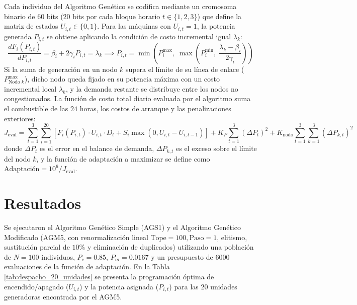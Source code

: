 \documentclass[11pt,letterpaper]{article}
\begin{document}
Cada individuo del Algoritmo Genético se codifica mediante un cromosoma binario de $60$ bits ($20$ bits por cada bloque horario $t \in \{1, 2, 3\}$) que define la matriz de estados $U_{i,t} \in \{0, 1\}$. Para las máquinas con $U_{i,t} = 1$, la potencia generada $P_{i,t}$ se obtiene aplicando la condición de costo incremental igual $\lambda_k$:
\begin{equation}
    \frac{dF_i(P_{i,t})}{dP_{i,t}} = \beta_i + 2\gamma_i P_{i,t} = \lambda_k \implies P_{i,t} = \min\left(P_i^{\max}, \; \max\left(P_i^{\min}, \; \frac{\lambda_k - \beta_i}{2\gamma_i}\right)\right)
\end{equation}
Si la suma de generación en un nodo $k$ supera el límite de su línea de enlace ($P_{\text{Nodo } k}^{\max}$), dicho nodo queda fijado en su potencia máxima con un costo incremental local $\lambda_k$, y la demanda restante se distribuye entre los nodos no congestionados. La función de costo total diario evaluada por el algoritmo suma el combustible de las $24$ horas, los costos de arranque y las penalizaciones exteriores:
\begin{equation}
    J_{\text{eval}} = \sum_{t=1}^{3} \sum_{i=1}^{20} \left[ F_i(P_{i,t})\cdot U_{i,t} \cdot D_t + S_i \max(0, U_{i,t} - U_{i,t-1}) \right] + K_P \sum_{t=1}^{3} \left(\Delta P_t\right)^2 + K_{\text{nodo}} \sum_{t=1}^{3}\sum_{k=1}^{3} \left(\Delta P_{k,t}\right)^2
\end{equation}
donde $\Delta P_t$ es el error en el balance de demanda, $\Delta P_{k,t}$ es el exceso sobre el límite del nodo $k$, y la función de adaptación a maximizar se define como $\text{Adaptación} = 10^6 / J_{\text{eval}}$.

\section{Resultados}

Se ejecutaron el Algoritmo Genético Simple (AGS1) y el Algoritmo Genético Modificado (AGM5, con renormalización lineal $\text{Tope}=100, \text{Paso}=1$, elitismo, sustitución parcial de $10\%$ y eliminación de duplicados) utilizando una población de $N = 100$ individuos, $P_c = 0.85$, $P_m = 0.0167$ y un presupuesto de $6000$ evaluaciones de la función de adaptación. En la Tabla \ref{tab:despacho_20_unidades} se presenta la programación óptima de encendido/apagado ($U_{i,t}$) y la potencia asignada ($P_{i,t}$) para las $20$ unidades generadoras encontrada por el AGM5.
\end{document}
